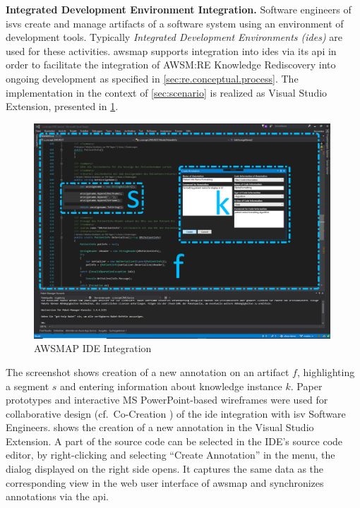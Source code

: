 \textbf{Integrated Development Environment Integration.} Software engineers of \glspl{isv} create and manage \glspl{artifact} of a software system using an environment of development tools.
Typically \emph{Integrated Development Environments (\glspl{ide})} are used for these activities.
\gls{awsmap} supports integration into \glspl{ide} via its  \gls{api} in order to facilitate the integration of AWSM:RE Knowledge Rediscovery into ongoing development as specified in \cref{sec:re.conceptual.process}.
The implementation in the context of \cref{sec:scenario} is realized as Visual Studio Extension, presented in \cref{fig:awsmap.ide}.
\begin{figure}[h!]
\hypertarget{fig:awsmap.ide}{%
\centering
\includegraphics[width=0.99\textwidth]{../figures/screenshots/ide-integration-hd2.png}
\caption{AWSMAP IDE Integration}\label{fig:awsmap.ide}
}
\end{figure}
The screenshot shows creation of a new annotation on an \gls{artifact} \(f\), highlighting a segment \(s\) and entering information about knowledge instance \(k\).
Paper prototypes and interactive MS PowerPoint-based wireframes were used for collaborative design (cf.~Co-Creation \autocite{HCD2015}) of the \gls{ide} integration with \gls{isv} Software Engineers.
 shows the creation of a new annotation in the Visual Studio Extension.
A part of the source code can be selected in the IDE's source code editor, by right-clicking and selecting ``Create Annotation'' in the menu, the dialog displayed on the right side opens.
It captures the same data as the corresponding view in the \gls{web} user interface of \gls{awsmap} and synchronizes annotations via the  \gls{api}.

